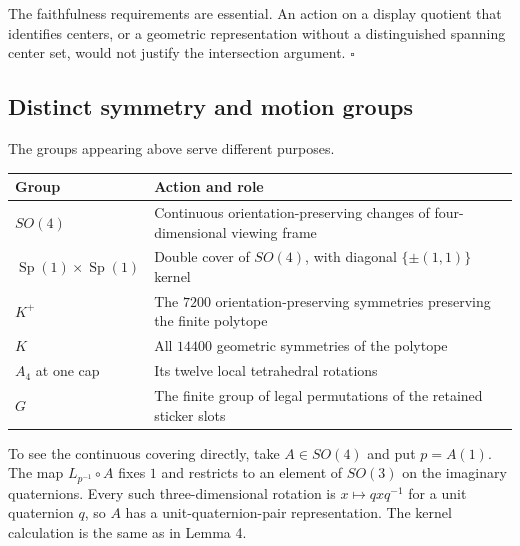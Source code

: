 \documentclass[
  10pt,
  a4paper,
]{article}
\newcounter{none} %
\begin{document}
The faithfulness requirements are essential. An action on a display
quotient that identifies centers, or a geometric representation without
a distinguished spanning center set, would not justify the intersection
argument. \(\square\)

\subsection{Distinct symmetry and motion
groups}\label{distinct-symmetry-and-motion-groups}

The groups appearing above serve different purposes.

{\def\LTcaptype{none} %
\begin{longtable}[]{@{}
  >{\raggedright\arraybackslash}p{}
  >{\raggedright\arraybackslash}p{}@{}}
\toprule\noalign{}
\begin{minipage}[b]{\linewidth}\raggedright
Group
\end{minipage} & \begin{minipage}[b]{\linewidth}\raggedright
Action and role
\end{minipage} \\
\midrule\noalign{}
\endhead
\bottomrule\noalign{}
\endlastfoot
\(SO(4)\) & Continuous orientation-preserving changes of
four-dimensional viewing frame \\
\(\operatorname{Sp}(1)\times\operatorname{Sp}(1)\) & Double cover of
\(SO(4)\), with diagonal \(\{\pm(1,1)\}\) kernel \\
\(K^+\) & The \(7200\) orientation-preserving symmetries preserving the
finite polytope \\
\(K\) & All \(14400\) geometric symmetries of the polytope \\
\(A_4\) at one cap & Its twelve local tetrahedral rotations \\
\(G\) & The finite group of legal permutations of the retained sticker
slots \\
\end{longtable}
}

To see the continuous covering directly, take \(A\in SO(4)\) and put
\(p=A(1)\). The map \(L_{p^{-1}}\circ A\) fixes \(1\) and restricts to
an element of \(SO(3)\) on the imaginary quaternions. Every such
three-dimensional rotation is \(x\mapsto qxq^{-1}\) for a unit
quaternion \(q\), so \(A\) has a unit-quaternion-pair representation.
The kernel calculation is the same as in Lemma 4.
\end{document}
